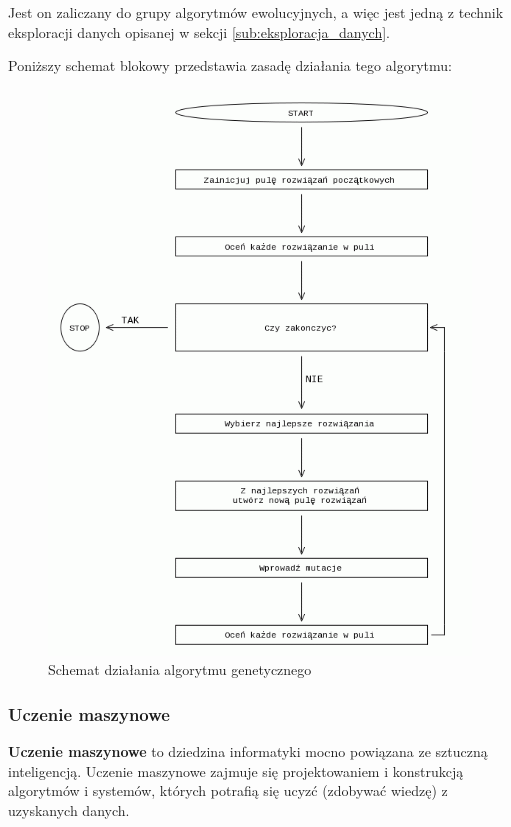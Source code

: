 Jest on zaliczany do grupy algorytmów ewolucyjnych, a więc jest jedną z technik eksploracji danych opisanej w sekcji \ref{sub:eksploracja_danych}.

Poniższy schemat blokowy przedstawia zasadę działania tego algorytmu:
\begin{figure}[h]
    \centerline{\includegraphics[scale=0.5]{obrazki/algorytm_genetyczny.png}}
    \caption{Schemat działania algorytmu genetycznego}
    \label{fig:alg_gen}
\end{figure}

\subsubsection{Uczenie maszynowe}
\label{sub:uczenie_maszynowe}
\textbf{Uczenie maszynowe} to dziedzina informatyki mocno powiązana ze sztuczną inteligencją. Uczenie maszynowe zajmuje się projektowaniem i konstrukcją algorytmów i systemów, których potrafią się ucyzć (zdobywać wiedzę) z uzyskanych danych.

